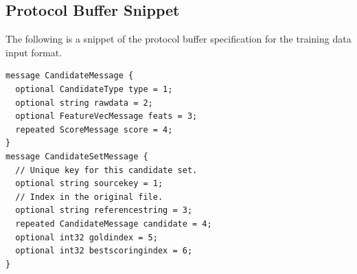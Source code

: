 \documentclass[a4paper]{article}
\begin{document}


\subsection{Protocol Buffer Snippet}

The following is a snippet of the protocol buffer specification for the
training data input format.
\scriptsize
\begin{verbatim}
message CandidateMessage {
  optional CandidateType type = 1;
  optional string rawdata = 2;
  optional FeatureVecMessage feats = 3;
  repeated ScoreMessage score = 4;
}
message CandidateSetMessage {
  // Unique key for this candidate set.
  optional string sourcekey = 1;
  // Index in the original file.
  optional string referencestring = 3;
  repeated CandidateMessage candidate = 4;
  optional int32 goldindex = 5;
  optional int32 bestscoringindex = 6;
}
\end{verbatim}
\normalsize
\end{document}
